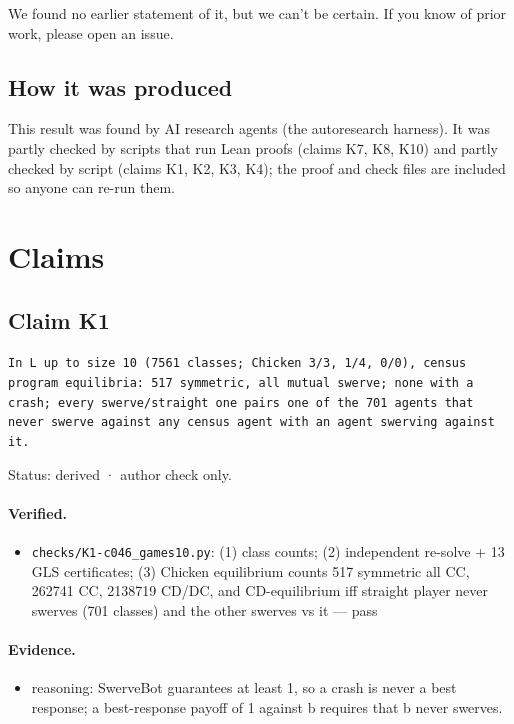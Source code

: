 \documentclass{article}
\begin{document}
We found no earlier statement of it, but we can't be certain. If you know of prior work, please open an issue.

\subsection*{How it was produced}

This result was found by AI research agents (the autoresearch harness). It was partly checked by scripts that run Lean proofs (claims K7, K8, K10) and partly checked by script (claims K1, K2, K3, K4); the proof and check files are included so anyone can re-run them.

\section{Claims}

\subsection*{Claim K1}

\texttt{In L up to size 10 (7561 classes; Chicken 3/3, 1/4, 0/0), census program equilibria: 517 symmetric, all mutual swerve; none with a crash; every swerve/straight one pairs one of the 701 agents that never swerve against any census agent with an agent swerving against it.}

Status: derived · author check only.

\paragraph{Verified.}
\begin{itemize}
\item \texttt{checks/K1-c046\_games10.py}: (1) class counts; (2) independent re-solve + 13 GLS certificates; (3) Chicken equilibrium counts 517 symmetric all CC, 262741 CC, 2138719 CD/DC, and CD-equilibrium iff straight player never swerves (701 classes) and the other swerves vs it --- pass
\end{itemize}

\paragraph{Evidence.}
\begin{itemize}
\item reasoning: SwerveBot guarantees at least 1, so a crash is never a best response; a best-response payoff of 1 against b requires that b never swerves.
\end{itemize}
\end{document}
